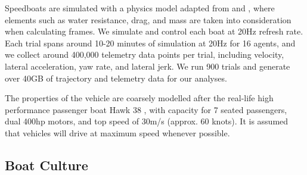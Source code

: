 \documentclass[acmsmall]{custom-arxiv}  %
\begin{document}
Speedboats are simulated with a physics model adapted from \citep{Monster2003CarGames} and \citep{Linkovich2016Carphysics2d}, where elements such as water resistance, drag, and mass are taken into consideration when calculating frames. We simulate and control each boat at 20Hz refresh rate. Each trial spans around 10-20 minutes of simulation at 20Hz for 16 agents, and we collect around 400,000 telemetry data points per trial, including velocity, lateral acceleration, yaw rate, and lateral jerk. We run 900 trials and generate over 40GB of trajectory and telemetry data for our analyses.

The properties of the vehicle are coarsely modelled after the real-life high performance passenger boat Hawk 38 \citep{Sunseeker2019SunseekerBrochure}, with capacity for 7 seated passengers, dual 400hp motors, and top speed of 30m/s (approx. 60 knots). It is assumed that vehicles will drive at maximum speed whenever possible.

\subsection{Boat Culture}
\end{document}

